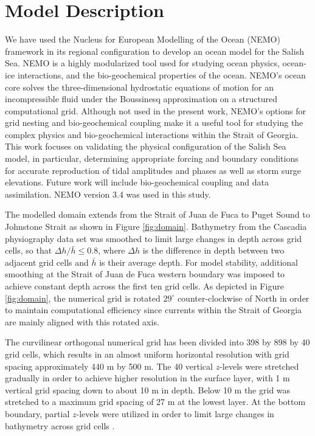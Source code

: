 \documentclass{tATO2e}
\begin{document}
\section{Model Description}\label{sec:config}

We have used the Nucleus for European Modelling of the Ocean (NEMO) framework in its regional configuration \citep{madec2012nemo} to develop an ocean model for the Salish Sea. NEMO is a highly modularized tool used for studying ocean physics, ocean-ice interactions, and the bio-geochemical properties of the ocean. NEMO's ocean core solves the three-dimensional hydrostatic equations of motion for an incompressible fluid under the Boussinesq approximation on a structured computational grid. Although not used in the present work, NEMO's options for grid nesting and bio-geochemical coupling make it a useful tool for studying the complex physics and bio-geochemical interactions within the Strait of Georgia. This work focuses on validating the physical configuration of the Salish Sea model, in particular, determining appropriate forcing and boundary conditions for accurate reproduction of tidal amplitudes and phases as well as storm surge elevations. Future work will include bio-geochemical coupling and data assimilation. NEMO version 3.4 was used in this study.

The modelled domain extends from the Strait of Juan de Fuca to Puget Sound to Johnstone Strait as shown in Figure \ref{fig:domain}. Bathymetry from the Cascadia physiography data set \citep{haugerud1999digital} was smoothed to limit large changes in depth across grid cells, so that $\Delta h/\bar{h} \leq 0.8$, where $\Delta h$ is the difference in depth between two adjacent grid cells and $\bar{h}$ is their average depth. For model stability, additional smoothing at the Strait of Juan de Fuca western boundary was imposed to achieve constant depth across the first ten grid cells. As depicted in Figure \ref{fig:domain}, the numerical grid is rotated $29^{\circ}$ counter-clockwise of North in order to maintain computational efficiency since currents within the Strait of Georgia are mainly aligned with this rotated axis. 

The curvilinear orthogonal numerical grid has been divided into 398 by 898 by 40 grid cells, which results in an almost uniform horizontal resolution with grid spacing approximately 440 m by 500 m. The 40 vertical $z$-levels were stretched gradually in order to achieve higher resolution in the surface layer, with 1 m vertical grid spacing down to about 10 m in depth. Below 10 m the grid was stretched to a maximum grid spacing of 27 m at the lowest layer. At the bottom boundary, partial $z$-levels were utilized in order to limit large changes in bathymetry across grid cells \citep{madec2012nemo}. 
\end{document}
